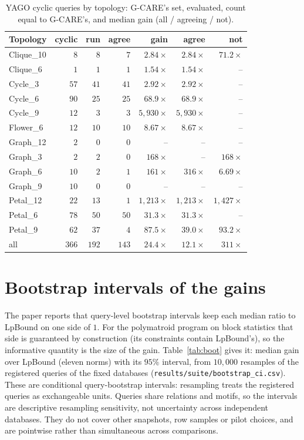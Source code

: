 \documentclass[11pt]{article}
\begin{document}
\begin{table}[h]
\centering
\caption{YAGO cyclic queries by topology: G-CARE's set, evaluated, count
equal to G-CARE's, and median gain (all / agreeing / not).}
\label{tab:yago-topo}
\small\setlength{\tabcolsep}{3pt}
\begin{tabular}{@{}lrrrrrr@{}}
\toprule
Topology & cyclic & run & agree & gain & agree & not \\
\midrule
Clique\_10 & $8$ & $8$ & $7$ & $2.84\times$ & $2.84\times$ & $71.2\times$ \\
Clique\_6 & $1$ & $1$ & $1$ & $1.54\times$ & $1.54\times$ & -- \\
Cycle\_3 & $57$ & $41$ & $41$ & $2.92\times$ & $2.92\times$ & -- \\
Cycle\_6 & $90$ & $25$ & $25$ & $68.9\times$ & $68.9\times$ & -- \\
Cycle\_9 & $12$ & $3$ & $3$ & $5{,}930\times$ & $5{,}930\times$ & -- \\
Flower\_6 & $12$ & $10$ & $10$ & $8.67\times$ & $8.67\times$ & -- \\
Graph\_12 & $2$ & $0$ & $0$ & -- & -- & -- \\
Graph\_3 & $2$ & $2$ & $0$ & $168\times$ & -- & $168\times$ \\
Graph\_6 & $10$ & $2$ & $1$ & $161\times$ & $316\times$ & $6.69\times$ \\
Graph\_9 & $10$ & $0$ & $0$ & -- & -- & -- \\
Petal\_12 & $22$ & $13$ & $1$ & $1{,}213\times$ & $1{,}213\times$ & $1{,}427\times$ \\
Petal\_6 & $78$ & $50$ & $50$ & $31.3\times$ & $31.3\times$ & -- \\
Petal\_9 & $62$ & $37$ & $4$ & $87.5\times$ & $39.0\times$ & $93.2\times$ \\
\midrule
all & $366$ & $192$ & $143$ & $24.4\times$ & $12.1\times$ & $311\times$ \\
\bottomrule
\end{tabular}
\end{table}

\section{Bootstrap intervals of the gains}
The paper reports that query-level bootstrap intervals keep each median
ratio to LpBound on one side of $1$. For the polymatroid program on block
statistics that side is guaranteed by construction (its constraints contain
LpBound's), so the informative quantity is the size of the gain.
Table~\ref{tab:boot} gives it: median gain over LpBound (eleven norms) with
its $95\%$ interval, from $10{,}000$ resamples of the registered queries of
the fixed databases (\texttt{results/suite/bootstrap\_ci.csv}). These are conditional query-bootstrap intervals: resampling treats the registered queries as exchangeable units. Queries share relations and motifs, so the intervals are descriptive resampling sensitivity, not uncertainty across independent databases. They do not cover other snapshots, row samples or pilot choices, and are pointwise rather than simultaneous across comparisons.
\end{document}
